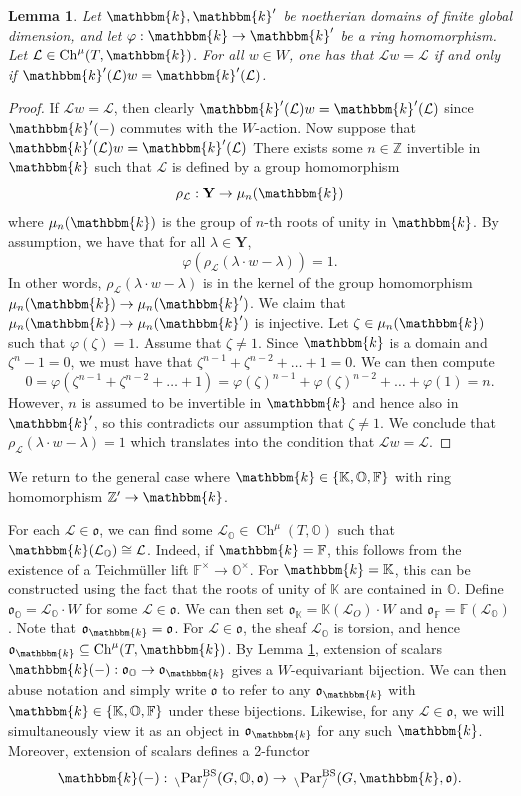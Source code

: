 \documentclass{amsart}
\newcommand{\Z}{\mathbb{Z}}
\newcommand{\F}{\mathbb{F}}
\renewcommand{\O}{\mathbb{O}}
\newcommand{\K}{\mathbb{K}}
\renewcommand{\k}{\mathbbm{k}}
\newcommand{\bfY}{\mathbf{Y}}
\newcommand{\scrL}{\mathcal{L}}
\DeclareMathOperator{\Ch}{Ch}
\newcommand{\fr}[1]{\mathfrak{#1}}
\DeclareMathOperator{\BS}{BS}
\newcommand{\PEE}[2]{\:_{#1 \backslash} \textnormal{Par}_{/ #2} }
\newtheorem{lemma}[subsubsection]{Lemma}
\theoremstyle{definition}
\numberwithin{equation}{subsection}
\begin{document}
\begin{lemma}\label{lem:eos_and_torsion_loc_sys}
  Let $\k, \k'$ be noetherian domains of finite global dimension, and let $\varphi : \k \to \k'$ be a ring homomorphism.
  Let $\scrL \in \Ch^{\mu} (T, \k)$.
  For all $w \in W$, one has that $\scrL w = \scrL$ if and only if $\k' (\scrL) w = \k' (\scrL)$.
\end{lemma}
\begin{proof}
  If $\scrL w = \scrL$, then clearly $\k' (\scrL) w = \k' (\scrL)$ since $\k' (-)$ commutes with the $W$-action.
  Now suppose that $\k' (\scrL) w = \k' (\scrL)$
  There exists some $n \in \Z$ invertible in $\k$ such that $\scrL$ is defined by a group homomorphism
  \[\rho_{\scrL} : \bfY \to \mu_n (\k)\]
  where $\mu_n (\k)$ is the group of $n$-th roots of unity in $\k$. By assumption, we have that for all $\lambda \in \bfY$,
  \[\varphi (\rho_{\scrL} (\lambda \cdot w - \lambda)) = 1.\]
  In other words, $\rho_{\scrL} (\lambda \cdot w - \lambda)$ is in the kernel of the group homomorphism $\mu_n (\k) \to \mu_n (\k')$.
  We claim that $\mu_n (\k) \to \mu_n (\k')$ is injective. Let $\zeta \in \mu_n (\k)$ such that $\varphi (\zeta) = 1$.
  Assume that $\zeta \neq 1$. Since $\k$ is a domain and $\zeta^n - 1 =0$, we must have that $\zeta^{n-1} + \zeta^{n-2} + \ldots + 1 = 0$.
  We can then compute
  \[0 = \varphi  (\zeta^{n-1} + \zeta^{n-2} + \ldots + 1) = \varphi(\zeta)^{n-1} + \varphi (\zeta)^{n-2} + \ldots + \varphi (1) = n.\]
  However, $n$ is assumed to be invertible in $\k$ and hence also in $\k'$, so this contradicts our assumption that $\zeta \neq 1$.
  We conclude that $\rho_{\scrL} (\lambda \cdot w - \lambda) = 1$ which translates into the condition that $\scrL w = \scrL$.
\end{proof}

We return to the general case where $\k \in \{\K, \O, \F\}$ with ring homomorphism $\Z' \to \k$.

For each $\scrL \in \fr{o}$, we can find some $\scrL_{\O} \in \Ch^{\mu} (T, \O)$ such that $\k (\scrL_{\O}) \cong \scrL$.
Indeed, if $\k = \F$, this follows from the existence of a Teichmüller lift $\F^{\times} \to \O^{\times}$. For $\k = \K$, this can be constructed using the fact that the roots of unity of $\K$ are contained in $\O$.
Define $\fr{o}_{\O} = \scrL_{\O} \cdot W$ for some $\scrL \in \fr{o}$. We can then set $\fr{o}_{\K} = \K (\scrL_{O}) \cdot W$ and $\fr{o}_{\F} = \F (\scrL_{\O})$.
Note that $\fr{o}_{\k} = \fr{o}$.
For $\scrL \in \fr{o}$, the sheaf $\scrL_{\O}$ is torsion, and hence $\fr{o}_{\k} \subseteq \Ch^{\mu} (T, \k)$.
By Lemma \ref{lem:eos_and_torsion_loc_sys}, extension of scalars $\k (-) : \fr{o}_{\O} \to \fr{o}_{\k}$ gives a $W$-equivariant bijection.
We can then abuse notation and simply write $\fr{o}$ to refer to any $\fr{o}_{\k}$ with $\k \in \{\K, \O, \F\}$ under these bijections. 
Likewise, for any $\scrL \in \fr{o}$, we will simultaneously view it as an object in $\fr{o}_{\k}$ for any such $\k$.
Moreover, extension of scalars defines a 2-functor
\[\k (-) : \PEE{}{}^{\BS} (G, \O, \fr{o}) \to  \PEE{}{}^{\BS} (G, \k, \fr{o}).\]
\end{document}
